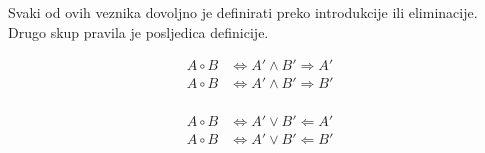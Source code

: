 \begin{longsik}
Svaki od ovih veznika dovoljno je definirati preko introdukcije ili eliminacije. 
Drugo skup pravila je posljedica definicije.

\begin{align*}
  A \circ B & \iff A' \wedge B' \Rightarrow A' \\
  A \circ B & \iff A' \wedge B'   \Rightarrow B'\\
\end{align*}


\begin{align*}
  A \circ B & \iff A' \vee B' \Leftarrow A' \\
  A \circ B & \iff A' \vee B' \Leftarrow B'\\
\end{align*}




\end{longsik}





